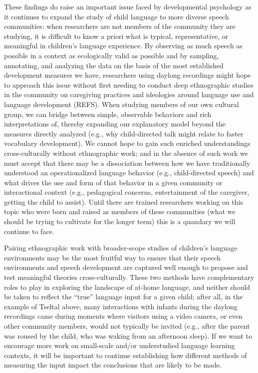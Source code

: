 \documentclass[,man,floatsintext]{apa6}
\begin{document}
These findings do raise an important issue faced by developmental
psychology as it continues to expand the study of child language to more
diverse speech communities: when researchers are not members of the
community they are studying, it is difficult to know a priori what is
typical, representative, or meaningful in children's language
experience. By observing as much speech as possible in a context as
ecologically valid as possible and by sampling, annotating, and
analyzing the data on the basis of the most established development
measures we have, researchers using daylong recordings might hope to
approach this issue without first needing to conduct deep ethnographic
studies in the community on caregiving practices and ideologies around
language use and language development (REFS). When studying members of
our own cultural group, we can bridge between simple, observable
behaviors and rich interpretations of, thereby expanding our explanatory
model beyond the measures directly analyzed (e.g., why child-directed
talk might relate to faster vocabulary development). We cannot hope to
gain such enriched understandings cross-culturally without ethnographic
work; and in the absence of such work we must accept that there may be a
dissociation between how we have traditionally understood an
operationalized language behavior (e.g., child-directed speech) and what
drives the use and form of that behavior in a given community or
interactional context (e.g., pedagogical concerns, entertainment of the
caregiver, getting the child to assist). Until there are trained
researchers working on this topic who were born and raised as members of
these communities (what we should be trying to cultivate for the longer
term) this is a quandary we will continue to face.

Pairing ethnographic work with broader-scope studies of children's
language environments may be the most fruitful way to ensure that their
speech environments and speech development are captured well enough to
propose and test meaningful theories cross-culturally. These two methods
have complementary roles to play in exploring the landscape of at-home
language, and neither should be taken to reflect the \enquote{true}
language input for a given child; after all, in the example of Tseltal
above, many interactions with infants during the daylong recordings came
during moments where visitors using a video camera, or even other
community members, would not typically be invited (e.g., after the
parent was roused by the child, who was waking from an afternoon sleep).
If we want to encourage more work on small-scale and/or understudied
language learning contexts, it will be important to continue
establishing how different methods of measuring the input impact the
conclusions that are likely to be made.
\end{document}
